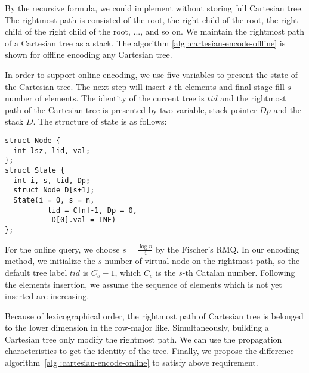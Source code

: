 

By the recursive formula,  we could implement without storing full
Cartesian tree.  The rightmost path is consisted of the root, the
right child of the root, the right child of the right child of the
root, ..., and so on.  We maintain the rightmost path of a Cartesian
tree as a stack.  The algorithm \ref{alg :cartesian-encode-offline} is
shown for offline encoding any Cartesian tree.

\iffalse
根據先前的字典順序編碼，只需要維護笛卡爾樹的右鏈，實作上與堆疊結構相同。
基於 row-major 順序和遞迴定義 ~\ref{fun:LCA}，修改之前論文對於的離線編碼，
其對應方案如算法 \ref{alg:cartesian-encode-offline}。
\fi



In order to support online encoding, we use five variables to present
the state of the Cartesian tree.  The next step will insert $i$-th
elements and final stage fill $s$ number of elements.  The identity of
the current tree is $\mathit{tid}$ and the rightmost path of the
Cartesian tree is presented by two variable, stack pointer $\mathit{Dp}$
and the stack $\mathit{D}$. The structure of state is as follows:

\iffalse
我們定義轉移狀態由 5 個變數來決定動態笛卡爾樹的編碼，當前插入第 $i$ 個元素，最終填充 $s$ 個元素，
當前的樹編號 $\mathit{tid}$，以及笛卡爾樹的右鏈狀態指針 $Dp$ 與其堆疊 $D$，其結構如下：
\fi

\begin{minipage}{0.9\linewidth}
\begin{lstlisting}[frame=single,caption=State of Cartesian Tree]
struct Node {
  int lsz, lid, val;
};
struct State {
  int i, s, tid, Dp;
  struct Node D[s+1];
  State(i = 0, s = n, 
          tid = C[n]-1, Dp = 0,
           D[0].val = INF)
};
\end{lstlisting}
\end{minipage}

For the online query, we choose $s=\frac{\log n}{4}$ by the Fischer's
RMQ.  In our encoding method, we initialize the $s$ number of virtual
node on the rightmost path, so the default tree label $\mathit{tid}$
is $C_s - 1$, which $C_s$ is the $s$-th Catalan number.  Following the
elements insertion, we assume the sequence of elements which is not
yet inserted are increasing.

Because of lexicographical order, the rightmost path of Cartesian tree
is belonged to the lower dimension in the row-major like.
Simultaneously, building a Cartesian tree only modify the rightmost
path. We can use the propagation characteristics to get the identity of
the tree.  Finally, we propose the difference algorithm~\ref{alg
:cartesian-encode-online} to satisfy above requirement.

